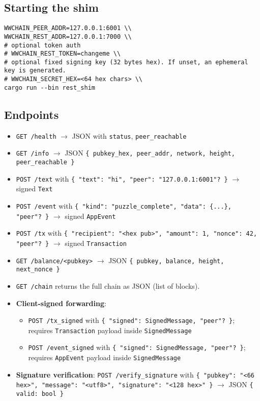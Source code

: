 \subsection{Starting the shim}
\begin{verbatim}
WWCHAIN_PEER_ADDR=127.0.0.1:6001 \\
WWCHAIN_REST_ADDR=127.0.0.1:7000 \\
# optional token auth
# WWCHAIN_REST_TOKEN=changeme \\
# optional fixed signing key (32 bytes hex). If unset, an ephemeral key is generated.
# WWCHAIN_SECRET_HEX=<64 hex chars> \\
cargo run --bin rest_shim
\end{verbatim}

\subsection{Endpoints}
\begin{itemize}
\item \texttt{GET /health} $\to$ JSON with \texttt{status}, \texttt{peer\_reachable}
\item \texttt{GET /info} $\to$ JSON \texttt{\{ pubkey\_hex, peer\_addr, network, height, peer\_reachable \}}
\item \texttt{POST /text} with \texttt{\{ "text": "hi", "peer": "127.0.0.1:6001"? \}} $\to$ signed \texttt{Text}
\item \texttt{POST /event} with \texttt{\{ "kind": "puzzle\_complete", "data": \{...\}, "peer"? \}} $\to$ signed \texttt{AppEvent}
\item \texttt{POST /tx} with \texttt{\{ "recipient": "<hex pub>", "amount": 1, "nonce": 42, "peer"? \}} $\to$ signed \texttt{Transaction}
\item \texttt{GET /balance/<pubkey>} $\to$ JSON \texttt{\{ pubkey, balance, height, next\_nonce \}}
\item \texttt{GET /chain} returns the full chain as JSON (list of blocks).
\item \textbf{Client-signed forwarding}:
  \begin{itemize}
  \item \texttt{POST /tx\_signed} with \texttt{\{ "signed": SignedMessage, "peer"? \}}; requires \texttt{Transaction} payload inside \texttt{SignedMessage}
  \item \texttt{POST /event\_signed} with \texttt{\{ "signed": SignedMessage, "peer"? \}}; requires \texttt{AppEvent} payload inside \texttt{SignedMessage}
  \end{itemize}
\item \textbf{Signature verification}: \texttt{POST /verify\_signature} with \texttt{\{ "pubkey": "<66 hex>", "message": "<utf8>", "signature": "<128 hex>" \}} $\to$ JSON \texttt{\{ valid: bool \}}
\end{itemize}

